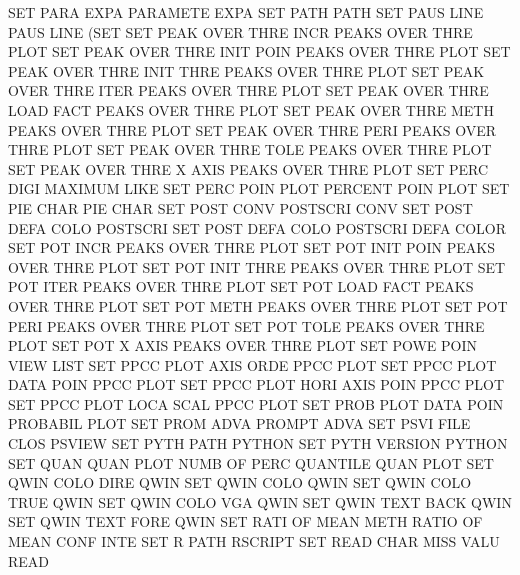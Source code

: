 SET      PARA EXPA                      PARAMETE EXPA
SET      PATH                           PATH
SET      PAUS LINE                      PAUS     LINE (SET
SET      PEAK OVER THRE INCR            PEAKS    OVER THRE PLOT
SET      PEAK OVER THRE INIT POIN       PEAKS    OVER THRE PLOT
SET      PEAK OVER THRE INIT THRE       PEAKS    OVER THRE PLOT
SET      PEAK OVER THRE ITER            PEAKS    OVER THRE PLOT
SET      PEAK OVER THRE LOAD FACT       PEAKS    OVER THRE PLOT
SET      PEAK OVER THRE METH            PEAKS    OVER THRE PLOT
SET      PEAK OVER THRE PERI            PEAKS    OVER THRE PLOT
SET      PEAK OVER THRE TOLE            PEAKS    OVER THRE PLOT
SET      PEAK OVER THRE X    AXIS       PEAKS    OVER THRE PLOT
SET      PERC DIGI                      MAXIMUM  LIKE
SET      PERC POIN PLOT                 PERCENT  POIN PLOT
SET      PIE  CHAR                      PIE      CHAR
SET      POST CONV                      POSTSCRI CONV
SET      POST DEFA COLO                 POSTSCRI
SET      POST DEFA COLO                 POSTSCRI DEFA COLOR
SET      POT  INCR                      PEAKS    OVER THRE PLOT
SET      POT  INIT POIN                 PEAKS    OVER THRE PLOT
SET      POT  INIT THRE                 PEAKS    OVER THRE PLOT
SET      POT  ITER                      PEAKS    OVER THRE PLOT
SET      POT  LOAD FACT                 PEAKS    OVER THRE PLOT
SET      POT  METH                      PEAKS    OVER THRE PLOT
SET      POT  PERI                      PEAKS    OVER THRE PLOT
SET      POT  TOLE                      PEAKS    OVER THRE PLOT
SET      POT  X    AXIS                 PEAKS    OVER THRE PLOT
SET      POWE POIN VIEW                 LIST
SET      PPCC PLOT AXIS ORDE            PPCC     PLOT
SET      PPCC PLOT DATA POIN            PPCC     PLOT
SET      PPCC PLOT HORI AXIS POIN       PPCC     PLOT
SET      PPCC PLOT LOCA SCAL            PPCC     PLOT
SET      PROB PLOT DATA POIN            PROBABIL PLOT
SET      PROM ADVA                      PROMPT   ADVA
SET      PSVI FILE CLOS                 PSVIEW
SET      PYTH PATH                      PYTHON
SET      PYTH VERSION                   PYTHON
SET      QUAN QUAN PLOT NUMB OF   PERC  QUANTILE QUAN PLOT
SET      QWIN COLO DIRE                 QWIN
SET      QWIN COLO                      QWIN
SET      QWIN COLO TRUE                 QWIN
SET      QWIN COLO VGA                  QWIN
SET      QWIN TEXT BACK                 QWIN
SET      QWIN TEXT FORE                 QWIN
SET      RATI OF   MEAN METH            RATIO   OF    MEAN CONF INTE
SET      R    PATH                      RSCRIPT
SET      READ CHAR MISS VALU            READ
